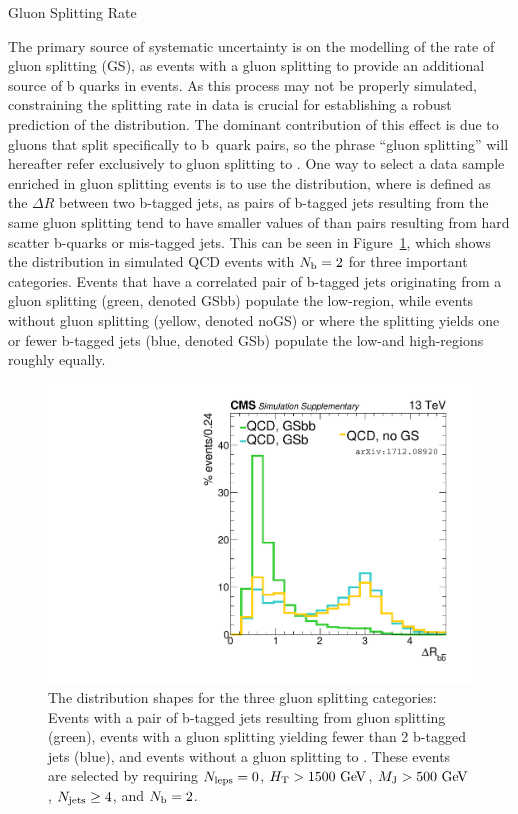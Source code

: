 \begin{section}{Gluon Splitting Rate}

The primary source of systematic uncertainty is on the modelling of the rate of gluon splitting (GS), as events with a gluon splitting to \bbbar provide an additional source of b quarks in events.
As this process may not be properly simulated, constraining the splitting rate in data is crucial for establishing a robust prediction of the \Nb distribution.
The dominant contribution of this effect is due to gluons that split specifically to b~quark pairs, so the phrase ``gluon splitting'' will hereafter refer exclusively to gluon splitting to \bbbar.
One way to select a data sample enriched in gluon splitting events is to use the \dRbb distribution, where \dRbb is defined as the $\Delta R$ between two b-tagged jets, as pairs of b-tagged jets resulting from the same gluon splitting tend to have smaller values of \dRbb than pairs resulting from hard scatter b-quarks or mis-tagged jets.
This can be seen in Figure~\ref{fig:dRbb_shapes}, which shows the \dRbb distribution in simulated QCD events with $N_{\mathrm{b}} = 2$ for three important categories.
Events that have a correlated pair of b-tagged jets originating from a gluon splitting (green, denoted GSbb) populate the low-\dRbb region, while events without gluon splitting (yellow, denoted noGS) or where the splitting yields one or fewer b-tagged jets (blue, denoted GSb) populate the low-and high-\dRbb regions roughly equally.

\begin{figure}[tbp!]
\begin{center}
\includegraphics[angle=0,width=0.60\columnwidth]{fig/dRbb_shapes.pdf}
\end{center}
\caption{The \dRbb distribution shapes for the three gluon splitting categories: 
Events with a pair of b-tagged jets resulting from gluon splitting (green), events with a gluon splitting yielding fewer than 2 b-tagged jets (blue), and events without a gluon splitting to \bbbar.
These events are selected by requiring $N_{\mathrm{leps}} = 0$, $H_{\mathrm{T}} > 1500~\mathrm{Ge\kern -0.1em V}$, $M_{\mathrm{J}} > 500~\mathrm{Ge\kern -0.1em V}$, $N_{\mathrm{jets}} \geq 4$, and $N_{\mathrm{b}} = 2$.}
\label{fig:dRbb_shapes}
\end{figure}


\end{section}
